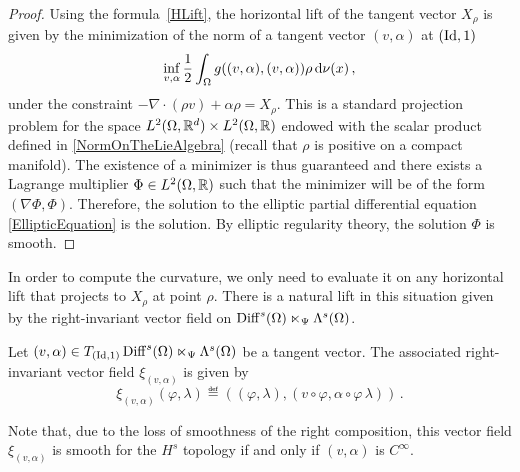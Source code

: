 \begin{proof}
Using the formula~\eqref{HLift}, the horizontal lift of the tangent vector $X_\rho$ is given by the minimization of the norm of a tangent vector $(v,\alpha)$ at $(\operatorname{Id},1)$
\begin{equation}\label{NormOnTheLieAlgebra}
\inf_{v,\alpha} \frac{1}{2} \int_{\Omega} g((v,\alpha),(v,\alpha)) \rho \, \mathrm{d} \nu(x) \,,
\end{equation}
under the constraint $-\nabla \cdot (\rho v)  + \alpha \rho = X_\rho$.
This is a standard projection problem for the space $L^2(\Omega,\mathbb{R}^d) \times L^2(\Omega,\mathbb{R})$ endowed with the scalar product defined in \eqref{NormOnTheLieAlgebra} (recall that $\rho$ is positive on a compact manifold). The existence of a minimizer is thus guaranteed and there exists a Lagrange multiplier $\Phi \in L^2(\Omega,\mathbb{R})$ such that the minimizer will be of the form $(\nabla \Phi,\Phi)$. Therefore, the solution to the elliptic partial differential equation \eqref{EllipticEquation} is the solution. By elliptic regularity theory, the solution $\Phi$ is smooth.
\end{proof}
In order to compute the curvature, we only need to evaluate it on any horizontal lift that projects to $X_\rho$ at point $\rho$. There is a natural lift in this situation given by the right-invariant vector field on $\operatorname{Diff}^{s}(\Omega) \ltimes_\Psi \Lambda^s(\Omega)$.
\begin{definition}
Let $(v,\alpha) \in T_{(\operatorname{Id},1)}\operatorname{Diff}^{s}(\Omega) \ltimes_\Psi \Lambda^s(\Omega)$ be a tangent vector. The associated right-invariant vector field $\xi_{(v,\alpha)}$ is given by 
\begin{equation}
\xi_{(v,\alpha)}(\varphi,\lambda) \eqdef \left( (\varphi,\lambda) , (v \circ \varphi, \alpha \circ \varphi \, \lambda) \right)\,.
\end{equation} 
\end{definition}
\begin{remark}
Note that, due to the loss of smoothness of the right composition, this vector field $\xi_{(v,\alpha)}$ is smooth for the $H^s$ topology if and only if $(v,\alpha)$ is $C^\infty$.
\end{remark}
